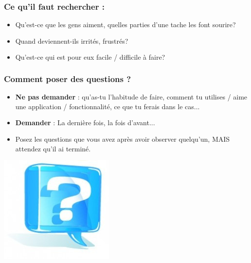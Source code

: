 \documentclass{beamer}
\begin{document}
\begin{frame}
\frametitle{Ce qu'il faut rechercher :}
\begin{itemize}
	\item Qu'est-ce que les gens aiment, quelles parties d'une tache les font sourire?
	\item Quand deviennent-ils irrités, frustrés?
	\item Qu'est-ce qui est pour eux facile / difficile à faire?
\end{itemize}
\end{frame}

\begin{frame}
\frametitle{Comment poser des questions ?}
\begin{itemize}
	\item \textbf{Ne pas demander} : qu'as-tu l'habitude de faire, comment tu utilises / aime une application / fonctionnalité, ce que tu ferais dans le cas...
	\item \textbf{Demander} : La dernière fois, la fois d'avant...
	\item Posez les questions que vous avez après avoir observer quelqu'un, MAIS attendez qu'il ai terminé.
\end{itemize}
\begin{center}
\includegraphics[scale=0.5]{question.jpg}
\end{center}
\end{frame}
\end{document}
